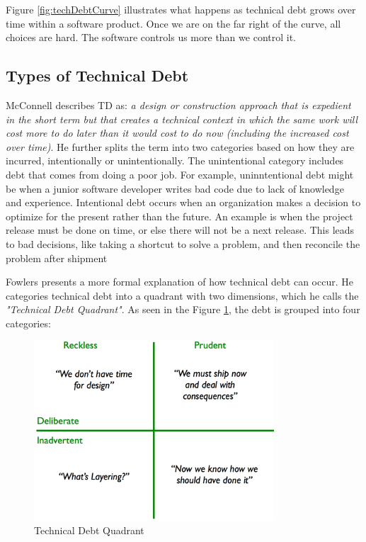 Figure \ref{fig:techDebtCurve} illustrates what happens as technical debt grows over time within a software product. Once we are on the far right of the curve, all choices are hard. The software controls us more than we control it.


\subsection{Types of Technical Debt}
McConnell describes TD as: \textit{a design or construction approach that is expedient in the short term but that creates a technical context in which the same work will cost more to do later than it would cost to do now (including the increased cost over time)}. He further splits the term into two categories based on how they are incurred, intentionally or unintentionally\cite{url-mcconnell}. The unintentional category includes debt that comes from doing a poor job. For example, uninntentional debt might be when a junior software developer writes bad code due to lack of knowledge and experience. Intentional debt occurs when an organization makes a decision to optimize for the present rather than the future. An example is when the project release must be done on time, or else there will not be a next release. This leads to bad decisions, like taking a shortcut to solve a problem, and then reconcile the problem after shipment

Fowlers presents a more formal explanation of how technical debt can occur\cite{url-fowler}. He categories technical debt into a quadrant with two dimensions, which he calls the \textit{"Technical Debt Quadrant"}. As seen in the Figure \ref{fig:techDebtQuad}, the debt is grouped into four categories: 

\begin{figure}[ht!]
	\centering
	\includegraphics[width=0.8\textwidth]{images/techDebtQuadrant.png}
	\caption{Technical Debt Quadrant}
	\label{fig:techDebtQuad}
\end{figure}

